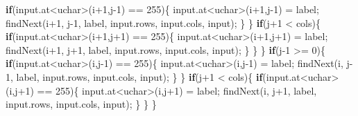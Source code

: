 \documentclass[]{article}
\newenvironment{Shaded}{\begin{snugshade}}{\end{snugshade}}
\newcommand{\KeywordTok}[1]{\textcolor[rgb]{0.13,0.29,0.53}{\textbf{{#1}}}}
\newcommand{\DataTypeTok}[1]{\textcolor[rgb]{0.13,0.29,0.53}{{#1}}}
\newcommand{\DecValTok}[1]{\textcolor[rgb]{0.00,0.00,0.81}{{#1}}}
\newcommand{\NormalTok}[1]{{#1}}
\begin{document}
\begin{Shaded}
\begin{Highlighting}[]
            \KeywordTok{if}\NormalTok{(input.at<}\DataTypeTok{uchar}\NormalTok{>(i}\DecValTok{+1}\NormalTok{,j}\DecValTok{-1}\NormalTok{) == }\DecValTok{255}\NormalTok{)\{}
                \NormalTok{input.at<}\DataTypeTok{uchar}\NormalTok{>(i}\DecValTok{+1}\NormalTok{,j}\DecValTok{-1}\NormalTok{) = label;}
                \NormalTok{findNext(i}\DecValTok{+1}\NormalTok{, j}\DecValTok{-1}\NormalTok{, label, input.rows, input.cols, input);}
            \NormalTok{\}}
        \NormalTok{\}}
        \KeywordTok{if}\NormalTok{(j}\DecValTok{+1} \NormalTok{< cols)\{}
            \KeywordTok{if}\NormalTok{(input.at<}\DataTypeTok{uchar}\NormalTok{>(i}\DecValTok{+1}\NormalTok{,j}\DecValTok{+1}\NormalTok{) == }\DecValTok{255}\NormalTok{)\{}
                \NormalTok{input.at<}\DataTypeTok{uchar}\NormalTok{>(i}\DecValTok{+1}\NormalTok{,j}\DecValTok{+1}\NormalTok{) = label;}
                \NormalTok{findNext(i}\DecValTok{+1}\NormalTok{, j}\DecValTok{+1}\NormalTok{, label, input.rows, input.cols, input);}
            \NormalTok{\}}
        \NormalTok{\}}
    \NormalTok{\}}
    \KeywordTok{if}\NormalTok{(j}\DecValTok{-1} \NormalTok{>= }\DecValTok{0}\NormalTok{)\{}
        \KeywordTok{if}\NormalTok{(input.at<}\DataTypeTok{uchar}\NormalTok{>(i,j}\DecValTok{-1}\NormalTok{) == }\DecValTok{255}\NormalTok{)\{}
            \NormalTok{input.at<}\DataTypeTok{uchar}\NormalTok{>(i,j}\DecValTok{-1}\NormalTok{) = label;}
            \NormalTok{findNext(i, j}\DecValTok{-1}\NormalTok{, label, input.rows, input.cols, input);}
        \NormalTok{\}}
    \NormalTok{\}}
    \KeywordTok{if}\NormalTok{(j}\DecValTok{+1} \NormalTok{< cols)\{}
        \KeywordTok{if}\NormalTok{(input.at<}\DataTypeTok{uchar}\NormalTok{>(i,j}\DecValTok{+1}\NormalTok{) == }\DecValTok{255}\NormalTok{)\{}
            \NormalTok{input.at<}\DataTypeTok{uchar}\NormalTok{>(i,j}\DecValTok{+1}\NormalTok{) = label;}
            \NormalTok{findNext(i, j}\DecValTok{+1}\NormalTok{, label, input.rows, input.cols, input);}
        \NormalTok{\}}
    \NormalTok{\}}
\NormalTok{\}}
\end{Highlighting}
\end{Shaded}
\end{document}
